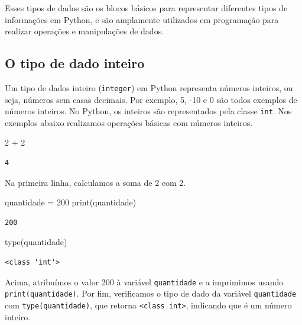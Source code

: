 \documentclass[
  portuguese,
  letterpaper,
  DIV=11,
  numbers=noendperiod]{scrreprt}
\newenvironment{Shaded}{\begin{snugshade}}{\end{snugshade}}
\newcommand{\BuiltInTok}[1]{\textcolor[rgb]{0.00,0.23,0.31}{#1}}
\newcommand{\DecValTok}[1]{\textcolor[rgb]{0.68,0.00,0.00}{#1}}
\newcommand{\NormalTok}[1]{\textcolor[rgb]{0.00,0.23,0.31}{#1}}
\newcommand{\OperatorTok}[1]{\textcolor[rgb]{0.37,0.37,0.37}{#1}}
\theoremstyle{definition}
\theoremstyle{remark}
\begin{document}
Esses tipos de dados são os blocos básicos para representar diferentes
tipos de informações em Python, e são amplamente utilizados em
programação para realizar operações e manipulações de dados.

\subsection{O tipo de dado inteiro}\label{o-tipo-de-dado-inteiro}

Um tipo de dados inteiro (\texttt{integer}) em Python representa números
inteiros, ou seja, números sem casas decimais. Por exemplo, 5, -10 e 0
são todos exemplos de números inteiros. No Python, os inteiros são
representados pela classe \texttt{int}. Nos exemplos abaixo realizamos
operações básicas com números inteiros.

\begin{Shaded}
\begin{Highlighting}[]
\DecValTok{2} \OperatorTok{+} \DecValTok{2}  
\end{Highlighting}
\end{Shaded}

\begin{verbatim}
4
\end{verbatim}

Na primeira linha, calculamos a soma de 2 com 2.

\begin{Shaded}
\begin{Highlighting}[]
\NormalTok{quantidade }\OperatorTok{=} \DecValTok{200}
\BuiltInTok{print}\NormalTok{(quantidade)}
\end{Highlighting}
\end{Shaded}

\begin{verbatim}
200
\end{verbatim}

\begin{Shaded}
\begin{Highlighting}[]
\BuiltInTok{type}\NormalTok{(quantidade)}
\end{Highlighting}
\end{Shaded}

\begin{verbatim}
<class 'int'>
\end{verbatim}

Acima, atribuímos o valor 200 à variável \texttt{quantidade} e a
imprimimos usando \texttt{print(quantidade)}. Por fim, verificamos o
tipo de dado da variável \texttt{quantidade} com
\texttt{type(quantidade)}, que retorna
\texttt{\textless{}class\ \textquotesingle{}int\textquotesingle{}\textgreater{}},
indicando que é um número inteiro.
\end{document}
